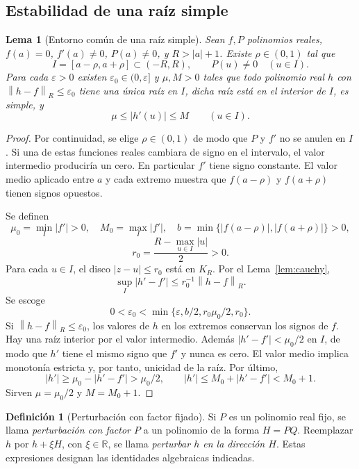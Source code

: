 \documentclass[11pt,a4paper]{article}
\numberwithin{equation}{section}
\newtheorem{lemma}[theorem]{Lema}
\theoremstyle{definition}
\newtheorem{definition}[theorem]{Definición}
\theoremstyle{remark}
\newcommand{\R}{\mathbb R}
\newcommand{\norm}[1]{\left\lVert#1\right\rVert}
\begin{document}
\subsection{Estabilidad de una raíz simple}
\begin{lemma}[Entorno común de una raíz simple]\label{lem:rootball}
Sean $f,P$ polinomios reales, $f(a)=0$, $f'(a)\ne0$, $P(a)\ne0$, y $R>|a|+1$. Existe $\rho\in(0,1)$ tal que
\[
I=[a-\rho,a+\rho]\subset(-R,R),\qquad P(u)\ne0\quad(u\in I).
\]
Para cada $\varepsilon>0$ existen $\varepsilon_0\in(0,\varepsilon]$ y $\mu,M>0$ tales que todo polinomio real $h$ con $\norm{h-f}_R\le\varepsilon_0$ tiene una única raíz en $I$, dicha raíz está en el interior de $I$, es simple, y
\begin{equation}\label{eq:rootbounds}
\mu\le |h'(u)|\le M\qquad(u\in I).
\end{equation}
\end{lemma}
\begin{proof}
Por continuidad, se elige $\rho\in(0,1)$ de modo que $P$ y $f'$ no se anulen en $I$. Si una de estas funciones reales cambiara de signo en el intervalo, el valor intermedio produciría un cero. En particular $f'$ tiene signo constante. El valor medio aplicado entre $a$ y cada extremo muestra que $f(a-\rho)$ y $f(a+\rho)$ tienen signos opuestos.

Se definen
\[
\mu_0=\min_I|f'|>0,\quad M_0=\max_I|f'|,\quad
b=\min\{|f(a-\rho)|,|f(a+\rho)|\}>0,
\]
\[
r_0=\frac{R-\max_{u\in I}|u|}{2}>0.
\]
Para cada $u\in I$, el disco $|z-u|\le r_0$ está en $K_R$. Por el Lema~\ref{lem:cauchy},
\[
\sup_I|h'-f'|\le r_0^{-1}\norm{h-f}_R.
\]
Se escoge
\[
0<\varepsilon_0<\min\{\varepsilon,b/2,r_0\mu_0/2,r_0\}.
\]
Si $\norm{h-f}_R\le\varepsilon_0$, los valores de $h$ en los extremos conservan los signos de $f$. Hay una raíz interior por el valor intermedio. Además $|h'-f'|<\mu_0/2$ en $I$, de modo que $h'$ tiene el mismo signo que $f'$ y nunca es cero. El valor medio implica monotonía estricta y, por tanto, unicidad de la raíz. Por último,
\[
|h'|\ge\mu_0-|h'-f'|>\mu_0/2,\qquad
|h'|\le M_0+|h'-f'|<M_0+1.
\]
Sirven $\mu=\mu_0/2$ y $M=M_0+1$.
\end{proof}

\begin{definition}[Perturbación con factor fijado]\label{def:perturbation}
Si $P$ es un polinomio real fijo, se llama \emph{perturbación con factor $P$} a un polinomio de la forma $H=PQ$. Reemplazar $h$ por $h+\xi H$, con $\xi\in\R$, se llama \emph{perturbar $h$ en la dirección $H$}. Estas expresiones designan las identidades algebraicas indicadas.
\end{definition}
\end{document}
